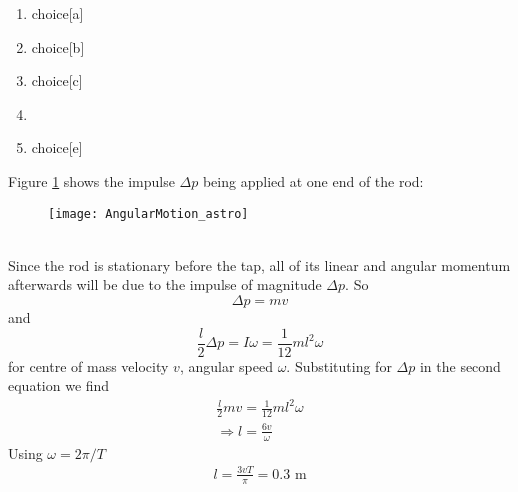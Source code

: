 
\begin{problem}
{
\begin{enumerate}
\item choice[a]{}
\item choice[b]{}
\item choice[c]{}
\item{}\correct
\item choice[e]{}
\end{enumerate}
}
{%
}
{
Figure \ref{fig:AngularMotion_astro} shows the impulse $\Delta p$ being applied at one end of the rod:
\begin{figure}[h]
\centering
\texttt{[image: AngularMotion\_astro]}
\caption{}
\label{fig:AngularMotion_astro}
\end{figure}
\\
Since the rod is stationary before the tap, all of its linear and angular momentum afterwards will be due to the impulse of magnitude $\Delta p$. So 
\begin{equation*}
\Delta p=mv
\end{equation*}
and
\begin{equation*}
\frac{l}{2}\Delta p=I\omega=\frac{1}{12}ml^2\omega
\end{equation*}
for centre of mass velocity $v$, angular speed $\omega$. Substituting for $\Delta p$ in the second equation we find
\begin{align*}
\frac{l}{2}mv=\frac{1}{12}ml^2\omega \\
\Rightarrow l=\frac{6v}{\omega}
\end{align*}
Using $\omega=2\pi/T$
\begin{align*}
l=\frac{3vT}{\pi}=0.3\textrm{ m}
\end{align*}
}
\end{problem}